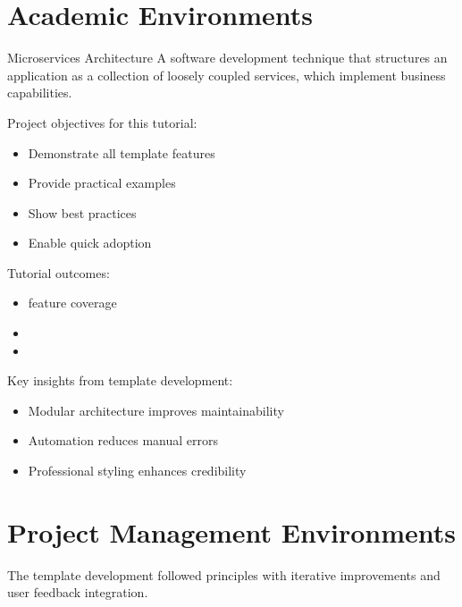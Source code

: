 \documentclass{internshipreport}
\begin{document}
\section{Academic Environments}

\begin{definition}{Microservices Architecture}
A software development technique that structures an application as a collection of loosely coupled services, which implement business capabilities.
\end{definition}

\begin{objectives}
Project objectives for this tutorial:
\begin{itemize}
\item Demonstrate all template features
\item Provide practical examples
\item Show best practices
\item Enable quick adoption
\end{itemize}
\end{objectives}

\begin{results}
Tutorial outcomes:
\begin{itemize}
\item {} feature coverage
\item {}
\item {}
\end{itemize}
\end{results}

\begin{keyfindings}
Key insights from template development:
\begin{itemize}
\item Modular architecture improves maintainability
\item Automation reduces manual errors
\item Professional styling enhances credibility
\end{itemize}
\end{keyfindings}

\section{Project Management Environments}

\begin{methodology}
The template development followed  principles with iterative improvements and user feedback integration.
\end{methodology}
\end{document}
